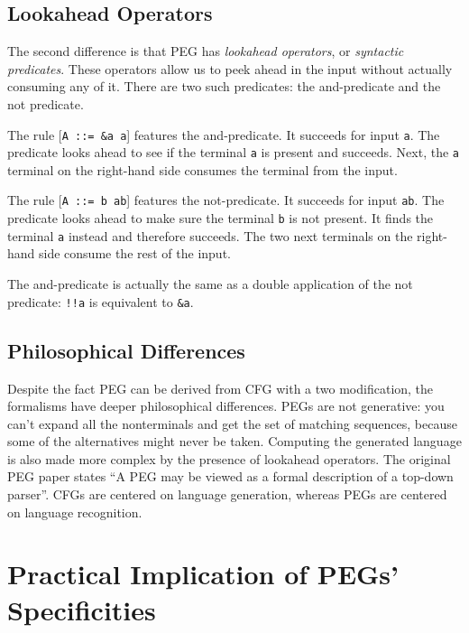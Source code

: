 \subsection{Lookahead Operators}
\label{lookahead_operators}

The second difference is that PEG has \emph{lookahead operators}, or
\emph{syntactic predicates}. These operators allow us to peek ahead in the input
without actually consuming any of it. There are two such predicates: the
and-predicate and the not predicate.

The rule [\texttt{A ::= \&a a}] features the and-predicate. It succeeds for
input \texttt{a}. The predicate looks ahead to see if the terminal \texttt{a} is
present and succeeds. Next, the \texttt{a} terminal on the right-hand side
consumes the terminal from the input.

The rule [\texttt{A ::= \!b ab}] features the not-predicate. It succeeds for
input \texttt{ab}. The predicate looks ahead to make sure the terminal
\texttt{b} is not present. It finds the terminal \texttt{a} instead and
therefore succeeds. The two next terminals on the right-hand side consume the
rest of the input.

The and-predicate is actually the same as a double application of the not
predicate: \texttt{!!a} is equivalent to \texttt{\&a}.

\subsection{Philosophical Differences}

Despite the fact PEG can be derived from CFG with a two modification, the
formalisms have deeper philosophical differences. PEGs are not generative: you
can't expand all the nonterminals and get the set of matching sequences, because
some of the alternatives might never be taken. Computing the generated language
is also made more complex by the presence of lookahead operators. The original
PEG paper \cite{ford2004} states ``A PEG may be viewed as a formal description
of a top-down parser''. CFGs are centered on language generation, whereas PEGs
are centered on language recognition.

\section{Practical Implication of PEGs' Specificities}
\label{peg_implications}

